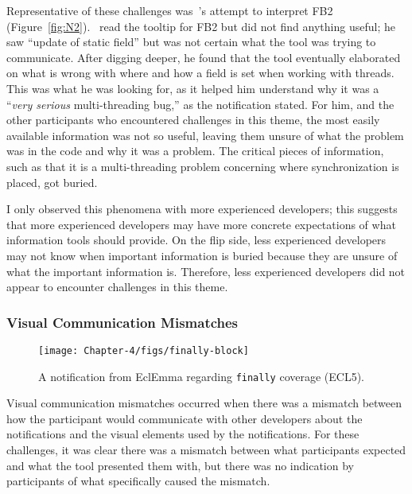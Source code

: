 Representative of these challenges was~'s attempt to interpret FB2 (Figure~\ref{fig:N2}).~ read the tooltip for FB2 but did not find anything useful; he saw ``update of static field'' but was not certain what the tool was trying to communicate. 
After digging deeper, he found that the tool eventually elaborated on what is wrong with where and how a field is set when working with threads. 
This was what he was looking for, as it helped him understand why it was a ``\emph{very serious} multi-threading bug,'' as the notification stated. 
For him, and the other participants who encountered challenges in this theme, the most easily available information was not so useful, leaving them unsure of what the problem was in the code and why it was a problem. 
The critical pieces of information, such as that it is a multi-threading problem concerning where synchronization is placed, got buried.

I only observed this phenomena with more experienced developers; this suggests that more experienced developers may have more concrete expectations of what information tools should provide.
On the flip side, less experienced developers may not know when important information is buried because they are unsure of what the important information is. Therefore, less experienced developers did not appear to encounter challenges in this theme.

\vspace{1.5em}

\subsubsection{Visual Communication Mismatches}\label{subsec:expectations}

\begin{figure} \centering \texttt{[image: Chapter-4/figs/finally-block]}
	\caption{A notification from EclEmma regarding \texttt{finally} coverage (ECL5).}
	\label{fig:finally}
\end{figure}


Visual communication mismatches occurred when there was a mismatch between how the participant would communicate with other developers about the notifications and the visual elements used by the notifications.
For these challenges, it was clear there was a mismatch between what participants expected and what the tool presented them with, but there was no indication by participants of what specifically caused the mismatch.


